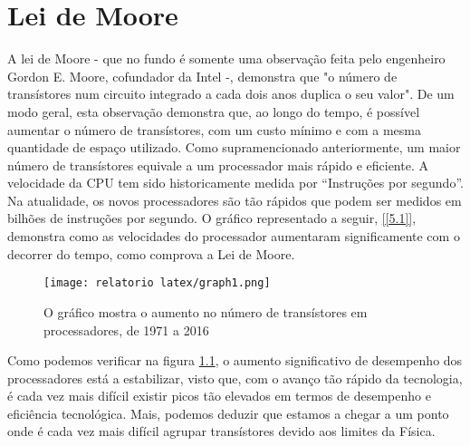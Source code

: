 \documentclass{report}
\begin{document}
\chapter{Lei de Moore}
\label{chap.Lei de Moore}
A lei de Moore - que no fundo é somente uma observação feita pelo engenheiro Gordon E. Moore, cofundador da Intel -, demonstra que "o número de transístores num circuito integrado a cada dois anos duplica o seu valor". De um modo geral, esta observação demonstra que, ao longo do tempo, é possível aumentar o número de transístores, com um custo mínimo e com a mesma quantidade de espaço utilizado. Como supramencionado anteriormente, um maior número de transístores equivale a um processador mais rápido e eficiente. A velocidade da \ac{CPU} tem sido historicamente medida por “Instruções por segundo”. Na atualidade, os novos processadores são tão rápidos que podem ser medidos em bilhões de instruções por segundo. O gráfico  representado a seguir, \ref{[5.1]}, demonstra como as velocidades do processador aumentaram significamente com o decorrer do tempo, como comprova a Lei de Moore\cite{Lei1}.


\begin{figure}[h!]
\centering
  \texttt{[image: relatorio latex/graph1.png]}
  \caption{O gráfico mostra o aumento no número de transístores em processadores, de 1971 a 2016}
  \label{fig:graph1}
\end{figure}




Como podemos verificar na figura \ref{fig:graph1}, o aumento significativo de desempenho dos processadores está a estabilizar, visto que, com o avanço tão rápido da tecnologia, é cada vez mais difícil existir picos tão elevados em termos de desempenho e eficiência tecnológica. Mais, podemos deduzir que estamos a chegar a um ponto onde é cada vez mais difícil agrupar transístores devido aos limites da Física\cite{Lei1}\cite{Lei2}.
\end{document}
